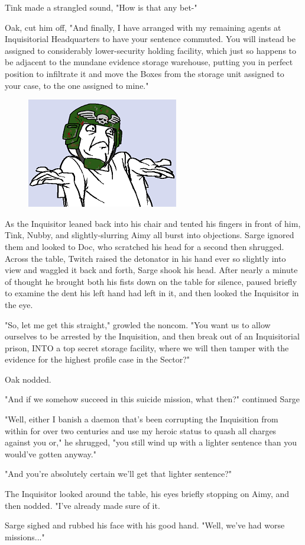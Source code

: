 Tink made a strangled sound, "How is that any bet-"

Oak, cut him off, "And finally, I have arranged with my remaining agents at Inquisitorial Headquarters to have your sentence commuted. 
You will instead be assigned to considerably lower-security holding facility, which just so happens to be adjacent to the mundane evidence storage warehouse, putting you in perfect position to infiltrate it and move the Boxes from the storage unit assigned to your case, to the one assigned to mine."


\begin{figure}
	\begin{center}
		\includegraphics[width=\figwidth]{pics/20/23.png}
	\end{center}
\end{figure}

As the Inquisitor leaned back into his chair and tented his fingers in front of him, Tink, Nubby, and slightly-slurring Aimy all burst into objections. 
Sarge ignored them and looked to Doc, who scratched his head for a second then shrugged. 
Across the table, Twitch raised the detonator in his hand ever so slightly into view and waggled it back and forth, Sarge shook his head. 
After nearly a minute of thought he brought both his fists down on the table for silence, paused briefly to examine the dent his left hand had left in it, and then looked the Inquisitor in the eye.

"So, let me get this straight," growled the noncom. 
"You want us to allow ourselves to be arrested by the Inquisition, and then break out of an Inquisitorial prison, INTO a top secret storage facility, where we will then tamper with the evidence for the highest profile case in the Sector?"

Oak nodded.

"And if we somehow succeed in this suicide mission, what then?" continued Sarge

"Well, either I banish a daemon that's been corrupting the Inquisition from within for over two centuries and use my heroic status to quash all charges against you or," he shrugged, "you still wind up with a lighter sentence than you would've gotten anyway."

"And you're absolutely certain we'll get that lighter sentence?"

The Inquisitor looked around the table, his eyes briefly stopping on Aimy, and then nodded. 
"I've already made sure of it.

Sarge sighed and rubbed his face with his good hand. 
"Well, we've had worse missions..."

